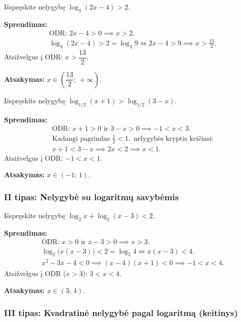 \begin{example}
Išspręskite nelygybę \(\log_3(2x - 4) > 2\).

\textbf{Sprendimas:}
\begin{align*}
&\text{ODR: } 2x - 4 > 0 \implies x > 2.\\
&\log_3(2x-4) > 2 = \log_3 9 \iff 2x - 4 > 9 \implies x > \frac{13}{2}.
\end{align*}
Atsižvelgus į ODR: \(x > \dfrac{13}{2}\).

\textbf{Atsakymas:} \(x \in \left(\dfrac{13}{2};\, +\infty\right)\).
\end{example}

\begin{example}
Išspręskite nelygybę \(\log_{1/2}(x + 1) > \log_{1/2}(3 - x)\).

\textbf{Sprendimas:}
\begin{align*}
&\text{ODR: } x + 1 > 0 \text{ ir } 3 - x > 0 \implies -1 < x < 3.\\
&\text{Kadangi pagrindas } \tfrac{1}{2} < 1, \text{ nelygybės kryptis keičiasi:}\\
&x + 1 < 3 - x \implies 2x < 2 \implies x < 1.
\end{align*}
Atsižvelgus į ODR: \(-1 < x < 1\).

\textbf{Atsakymas:} \(x \in (-1;\, 1)\).
\end{example}

\subsubsection{II tipas: Nelygybė su logaritmų savybėmis}

\begin{example}
Išspręskite nelygybę \(\log_2 x + \log_2(x - 3) < 2\).

\textbf{Sprendimas:}
\begin{align*}
&\text{ODR: } x > 0 \text{ ir } x - 3 > 0 \implies x > 3.\\
&\log_2\bigl(x(x-3)\bigr) < 2 = \log_2 4 \iff x(x-3) < 4.\\
&x^2 - 3x - 4 < 0 \implies (x-4)(x+1) < 0 \implies -1 < x < 4.
\end{align*}
Atsižvelgus į ODR (\(x > 3\)): \(3 < x < 4\).

\textbf{Atsakymas:} \(x \in (3;\, 4)\).
\end{example}

\subsubsection{III tipas: Kvadratinė nelygybė pagal logaritmą (keitinys)}

